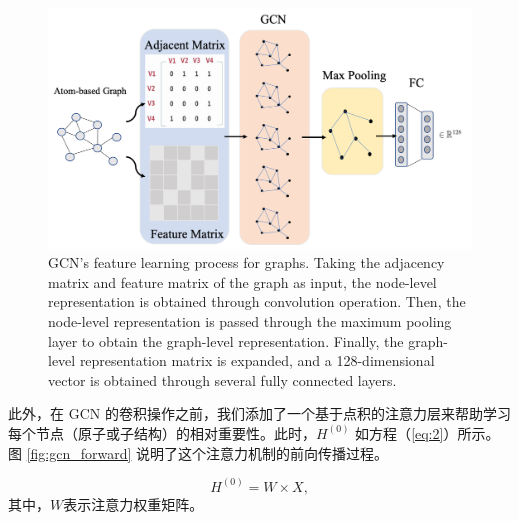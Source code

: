 \begin{figure}[!htbp] 
\centering
\includegraphics[width=1\textwidth]  {imgs/gcn.png}
{GCN's feature learning process for graphs. Taking the adjacency matrix and feature matrix of the graph as input, the node-level representation is obtained through convolution operation. Then, the node-level representation is passed through the maximum pooling layer to obtain the graph-level representation. Finally, the graph-level representation matrix is expanded, and a 128-dimensional vector is obtained through several fully connected layers.}
\label{fig:gcn}
\end{figure}

此外，在 GCN 的卷积操作之前，我们添加了一个基于点积的注意力层来帮助学习每个节点（原子或子结构）的相对重要性。此时，$H^{(0)}$ 如方程（\ref{eq:2}）所示。 图 \ref{fig:gcn_forward} 说明了这个注意力机制的前向传播过程。

\begin{equation}
  H^{(0)} = W \times X,
\label{eq:2}
\end{equation}
其中，$W$表示注意力权重矩阵。


